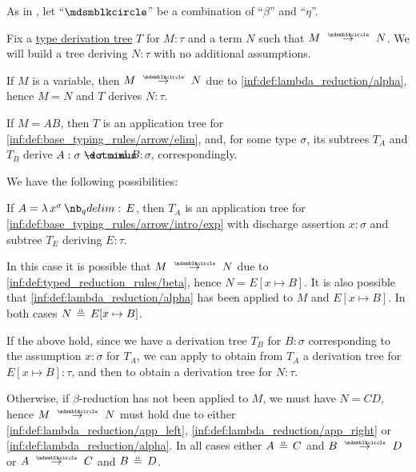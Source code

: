\begin{algorithm}\label{alg:typed_reduction}
  As in , let \enquote{\( {\Anon} \)} be a combination of \enquote{\( \beta \)} and \enquote{\( \eta \)}.

  Fix a \hyperref[def:type_derivation_tree]{type derivation tree} \( T \) for \( M: \tau \) and a term \( N \) such that \( M \pred N \). We will build a tree deriving \( N: \tau \) with no additional assumptions.

  \begin{thmenum}
     If \( M \) is a variable, then \( M \pred N \) due to \ref{inf:def:lambda_reduction/alpha}, hence \( M = N \) and \( T \) derives \( N: \tau \).

     If \( M = AB \), then \( T \) is an application tree for \ref{inf:def:base_typing_rules/arrow/elim}, and, for some type \( \sigma \), its subtrees \( T_A \) and \( T_B \) derive \( A: \sigma \synimplies \tau \) and \( B: \sigma \), correspondingly.

    We have the following possibilities:
    \begin{thmenum}
       If \( A = \qabs {x^\sigma} E \), then \( T_A \) is an application tree for \ref{inf:def:base_typing_rules/arrow/intro/exp} with discharge assertion \( x: \sigma \) and subtree \( T_E \) deriving \( E: \tau \).

      In this case it is possible that \( M \pred N \) due to \ref{inf:def:typed_reduction_rules/beta}, hence \( N = E[x \mapsto B] \). It is also possible that \ref{inf:def:lambda_reduction/alpha} has been applied to \( M \) and \( E[x \mapsto B] \). In both cases \( N \aequiv E[x \mapsto B] \).

      If the above hold, since we have a derivation tree \( T_B \) for \( B: \sigma \) corresponding to the assumption \( x: \sigma \) for \( T_A \), we can apply  to obtain from \( T_A \) a derivation tree for \( E[x \mapsto B]: \tau \), and then  to obtain a derivation tree for \( N: \tau \).

       Otherwise, if \( \beta \)-reduction has not been applied to \( M \), we must have \( N = CD \), hence \( M \pred N \) must hold due to either \ref{inf:def:lambda_reduction/app_left}, \ref{inf:def:lambda_reduction/app_right} or \ref{inf:def:lambda_reduction/alpha}. In all cases either \( A \aequiv C \) and \( B \pred D \) or \( A \pred C \) and \( B \aequiv D \).


\end{thmenum}
\end{thmenum}
\end{algorithm}
